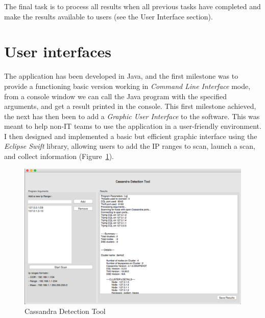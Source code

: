\documentclass[a4paper]{report}
\begin{document}
The final task is to process all results when all previous tasks have completed and make the results available to users (see the User Interface section).

\section{User interfaces}
The application has been developed in Java, and the first milestone was to provide a functioning basic version working in \emph{Command Line Interface} mode, from a console window we can call the Java program with the specified arguments, and get a result printed in the console. This first milestone achieved, the next has then been to add a \emph{Graphic User Interface} to the software. This was meant to help non-IT teams to use the application in a user-friendly environment. I then designed and implemented a basic but efficient graphic interface using the \emph{Eclipse Swift} library, allowing users to add the IP ranges to scan, launch a scan, and collect information (Figure~\ref{fig:cdt}).

\begin{figure}[ht!]
\centering
\includegraphics[scale=0.37]{cdt-preview.png}
\caption{Cassandra Detection Tool}
\label{fig:cdt}
\end{figure}
\end{document}
